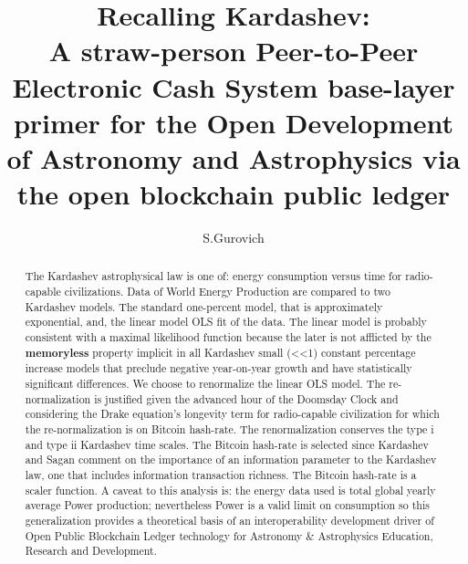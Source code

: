 \documentclass[final,5p,times,twocolumn,authoryear]{elsarticle}
\begin{document}
\begin{frontmatter}

\title{ Recalling Kardashev:\\ A straw-person Peer-to-Peer Electronic Cash System base-layer primer for the Open Development of Astronomy and Astrophysics via the open blockchain public ledger}
 
    \author[iate,wsu]{S.Gurovich}
  
\address[iate]{
   Instituto De Astronom\'ia Te\'orica y Experimental -
   Observatorio Astron\'omico C\'ordoba (IATE--OAC--UNC--CONICET),
   Laprida 854, X5000BGR, C\'ordoba, Argentina}
\address[wsu]{
   Western Sydney University, Kingswood campus, NSW, Australia
}

\begin{abstract}

The Kardashev astrophysical law is one of: energy consumption versus time for radio-capable civilizations. Data of World Energy Production are compared to two Kardashev models. The standard one-percent model, that is approximately exponential, and, the linear model OLS fit of the data. The linear model is probably consistent with a maximal likelihood function because the later is not afflicted by the \textbf{memoryless} property implicit in all Kardashev small (<<1) constant percentage increase models that preclude negative year-on-year growth and have statistically significant differences. We choose to renormalize the linear OLS model. The re-normalization is justified given the advanced hour of the Doomsday Clock and considering the Drake equation's longevity term for radio-capable civilization for which the re-normalization is on Bitcoin hash-rate. The renormalization conserves the type i and type ii Kardashev time scales. The Bitcoin hash-rate is selected since Kardashev and Sagan comment on the importance of an information parameter to the Kardashev law, one that includes information transaction richness. The Bitcoin hash-rate is a scaler function. A caveat to this analysis is: the energy data used is total global yearly average Power production; nevertheless Power is a valid limit on consumption so this generalization provides a theoretical basis of an interoperability development driver of Open Public Blockchain Ledger technology for Astronomy \& Astrophysics Education, Research and Development. 


\end{abstract}
\end{frontmatter}
\end{document}
